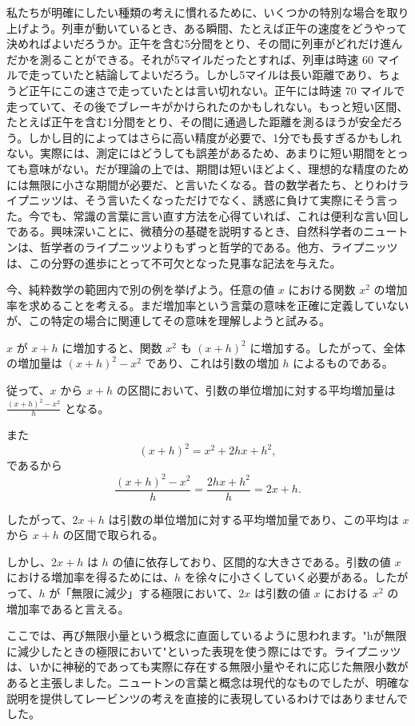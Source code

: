 \documentclass[a4paper,11pt,openany]{ltjsbook}
\begin{document}
私たちが明確にしたい種類の考えに慣れるために、いくつかの特別な場合を取り上げよう。列車が動いているとき、ある瞬間、たとえば正午の速度をどうやって決めればよいだろうか。正午を含む5分間をとり、その間に列車がどれだけ進んだかを測ることができる。それが5マイルだったとすれば、列車は時速 $60$ マイルで走っていたと結論してよいだろう。しかし5マイルは長い距離であり、ちょうど正午にこの速さで走っていたとは言い切れない。正午には時速 $70$ マイルで走っていて、その後でブレーキがかけられたのかもしれない。もっと短い区間、たとえば正午を含む1分間をとり、その間に通過した距離を測るほうが安全だろう。しかし目的によってはさらに高い精度が必要で、1分でも長すぎるかもしれない。実際には、測定にはどうしても誤差があるため、あまりに短い期間をとっても意味がない。だが理論の上では、期間は短いほどよく、理想的な精度のためには無限に小さな期間が必要だ、と言いたくなる。昔の数学者たち、とりわけライプニッツは、そう言いたくなっただけでなく、誘惑に負けて実際にそう言った。今でも、常識の言葉に言い直す方法を心得ていれば、これは便利な言い回しである。興味深いことに、微積分の基礎を説明するとき、自然科学者のニュートンは、哲学者のライプニッツよりもずっと哲学的である。他方、ライプニッツは、この分野の進歩にとって不可欠となった見事な記法を与えた。

今、純粋数学の範囲内で別の例を挙げよう。任意の値 \( x \) における関数 \( x^2 \) の増加率を求めることを考える。まだ増加率という言葉の意味を正確に定義していないが、この特定の場合に関連してその意味を理解しようと試みる。

\( x \) が \( x + h \) に増加すると、関数 \( x^2 \) も \( (x + h)^2 \) に増加する。したがって、全体の増加量は \( (x + h)^2 - x^2 \) であり、これは引数の増加 \( h \) によるものである。

従って、\( x \) から \( x + h \) の区間において、引数の単位増加に対する平均増加量は \(\frac{(x + h)^2 - x^2}{h}\) となる。

また
\[
(x + h)^2 = x^2 + 2hx + h^2,
\]
であるから
\[
\frac{(x + h)^2 - x^2}{h} = \frac{2hx + h^2}{h} = 2x + h.
\]

したがって、\( 2x + h \) は引数の単位増加に対する平均増加量であり、この平均は \( x \) から \( x + h \) の区間で取られる。

しかし、\( 2x + h \) は \( h \) の値に依存しており、区間的な大きさである。引数の値 \( x \) における増加率を得るためには、\( h \) を徐々に小さくしていく必要がある。したがって、\( h \) が「無限に減少」する極限において、\( 2x \) は引数の値 \( x \) における \( x^2 \) の増加率であると言える。

ここでは、再び無限小量という概念に直面しているように思われます。"hが無限に減少したときの極限において"といった表現を使う際にはです。ライプニッツは、いかに神秘的であっても実際に存在する無限小量やそれに応じた無限小数があると主張しました。ニュートンの言葉と概念は現代的なものでしたが、明確な説明を提供してレービンツの考えを直接的に表現しているわけではありませんでした。
\end{document}
